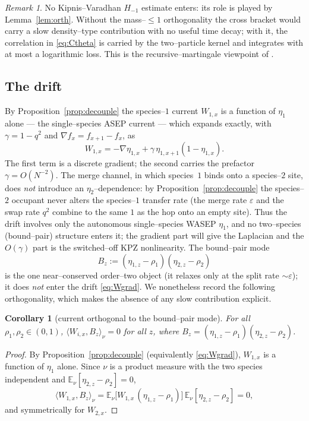 \documentclass[11pt]{article}
\theoremstyle{plain}
\newtheorem{corollary}[theorem]{Corollary}
\theoremstyle{definition}
\theoremstyle{remark}
\newtheorem{remark}[theorem]{Remark}
\newcommand{\E}{\mathbb{E}}\newcommand{\PP}{\mathbb{P}}\newcommand{\dd}{\,\mathrm{d}}
\newcommand{\ip}[2]{\langle #1,#2\rangle_\nu}\newcommand{\bone}{\mathbf 1}
\newcommand{\eps}{\varepsilon}\newcommand{\Exp}{\mathrm{Exp}}
\begin{document}
\begin{remark}\label{rem:noH}
No Kipnis--Varadhan $H_{-1}$ estimate enters: its role is played by
Lemma~\ref{lem:orth}. Without the mass--$\le1$ orthogonality the cross bracket would
carry a slow density--type contribution with no useful time decay; with it, the
correlation in \eqref{eq:Ctheta} is carried by the two--particle kernel and
integrates with at most a logarithmic loss. This is the recursive--martingale
viewpoint of \cite{ACR2}.
\end{remark}

\subsection{The drift}
By Proposition~\ref{prop:decouple} the species--$1$ current $W_{1,x}$ is a function of
$\eta_1$ alone --- the single--species ASEP current --- which expands exactly, with
$\gamma=1-q^2$ and $\nabla f_x=f_{x+1}-f_x$, as
\begin{equation}\label{eq:Wgrad}
  W_{1,x}=-\nabla\eta_{1,x}+\gamma\,\eta_{1,x+1}(1-\eta_{1,x}).
\end{equation}
The first term is a discrete gradient; the second carries the prefactor
$\gamma=O(N^{-2})$. The merge channel, in which species~$1$ binds onto a species--$2$
site, does \emph{not} introduce an $\eta_2$--dependence: by
Proposition~\ref{prop:decouple} the species--$2$ occupant never alters the species--$1$
transfer rate (the merge rate $\eps$ and the swap rate $q^2$ combine to the same $1$ as
the hop onto an empty site). Thus the drift involves only the autonomous single--species
WASEP $\eta_1$, and no two--species (bound--pair) structure enters it; the gradient part
will give the Laplacian and the $O(\gamma)$ part is the switched--off KPZ nonlinearity.
The bound--pair mode
\begin{equation}\label{eq:Bdef}
  B_z:=(\eta_{1,z}-\rho_1)(\eta_{2,z}-\rho_2)
\end{equation}
is the one near--conserved order--two object (it relaxes only at the split rate
$\sim\eps$); it does \emph{not} enter the drift \eqref{eq:Wgrad}. We nonetheless record
the following orthogonality, which makes the absence of any slow contribution explicit.

\begin{corollary}[current orthogonal to the bound--pair mode]\label{prop:sym}
For all $\rho_1,\rho_2\in(0,1)$, $\ip{W_{i,x}}{B_z}=0$ for all $z$, where
$B_z=(\eta_{1,z}-\rho_1)(\eta_{2,z}-\rho_2)$.
\end{corollary}
\begin{proof}
By Proposition~\ref{prop:decouple} (equivalently \eqref{eq:Wgrad}), $W_{1,x}$ is a
function of $\eta_1$ alone. Since $\nu$ is a product measure with the two species
independent and $\E_\nu[\eta_{2,z}-\rho_2]=0$,
\[
  \ip{W_{1,x}}{B_z}=\E_\nu\big[W_{1,x}\,(\eta_{1,z}-\rho_1)\big]\,\E_\nu[\eta_{2,z}-\rho_2]=0,
\]
and symmetrically for $W_{2,x}$.
\end{proof}
\end{document}
